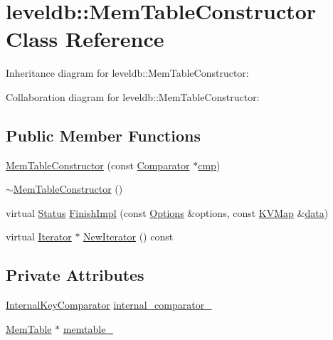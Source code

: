 \hypertarget{classleveldb_1_1_mem_table_constructor}{\section{leveldb\-:\-:Mem\-Table\-Constructor Class Reference}
\label{classleveldb_1_1_mem_table_constructor}
}


Inheritance diagram for leveldb\-:\-:Mem\-Table\-Constructor\-:


Collaboration diagram for leveldb\-:\-:Mem\-Table\-Constructor\-:
\subsection*{Public Member Functions}
\begin{DoxyCompactItemize}
\item 
\hyperlink{classleveldb_1_1_mem_table_constructor_a5f4c341eb97e6e3938ec05b98455664a}{Mem\-Table\-Constructor} (const \hyperlink{structleveldb_1_1_comparator}{Comparator} $\ast$\hyperlink{table__test_8cc_a87863e435922f0910ca8db43f02a6c0b}{cmp})
\item 
\hyperlink{classleveldb_1_1_mem_table_constructor_a893a3f902a8dbbe7c2548c3ab46512c1}{$\sim$\-Mem\-Table\-Constructor} ()
\item 
virtual \hyperlink{classleveldb_1_1_status}{Status} \hyperlink{classleveldb_1_1_mem_table_constructor_a78851e48bd187f231934e128ab050624}{Finish\-Impl} (const \hyperlink{structleveldb_1_1_options}{Options} \&options, const \hyperlink{namespaceleveldb_aac1e50450147be263e08252c6700f7a7}{K\-V\-Map} \&\hyperlink{classleveldb_1_1_constructor_a55a0363200d6e86d8beb3b15b75e3824}{data})
\item 
virtual \hyperlink{classleveldb_1_1_iterator}{Iterator} $\ast$ \hyperlink{classleveldb_1_1_mem_table_constructor_ae6eca097713c07eed6f630cca780fedd}{New\-Iterator} () const 
\end{DoxyCompactItemize}
\subsection*{Private Attributes}
\begin{DoxyCompactItemize}
\item 
\hyperlink{classleveldb_1_1_internal_key_comparator}{Internal\-Key\-Comparator} \hyperlink{classleveldb_1_1_mem_table_constructor_a77fb87fcc606b862e0aa997d97dd8275}{internal\-\_\-comparator\-\_\-}
\item 
\hyperlink{classleveldb_1_1_mem_table}{Mem\-Table} $\ast$ \hyperlink{classleveldb_1_1_mem_table_constructor_aee8e2d856ed9333890cce216b425edb8}{memtable\-\_\-}
\end{DoxyCompactItemize}


